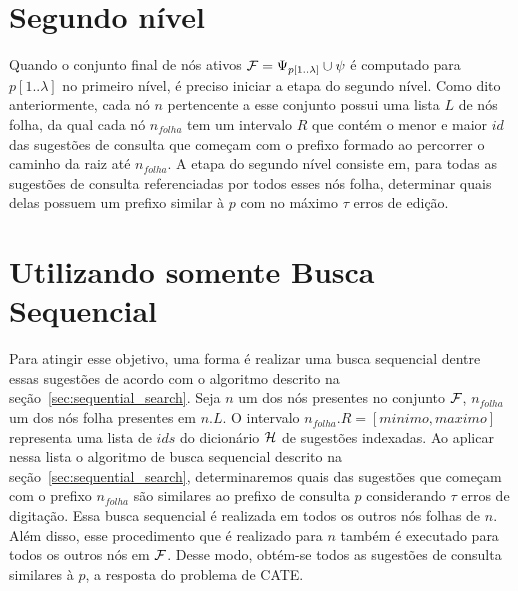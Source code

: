                 

\section{Segundo nível}
\label{sec:second_level}

Quando o conjunto final de nós ativos $\mathcal{F} = \Psi_{p[1..\lambda]} \cup \psi$ é computado para $p[1..\lambda]$ no primeiro nível, é preciso iniciar a etapa do segundo nível. Como dito anteriormente, cada nó $n$ pertencente a esse conjunto possui uma lista $L$ de nós folha, da qual cada nó $n_{folha}$ tem um intervalo $R$ que contém o menor e maior $id$ das sugestões de consulta que começam com o prefixo formado ao percorrer o caminho da raiz até $n_{folha}$. A etapa do segundo nível consiste em, para todas as sugestões de consulta referenciadas por todos esses nós folha, determinar quais delas possuem um prefixo similar à $p$ com no máximo $\tau$ erros de edição. 

\section{Utilizando somente Busca Sequencial} 
\label{sec:IP2L}

Para atingir esse objetivo, uma forma é realizar uma busca sequencial dentre essas sugestões de acordo com o algoritmo descrito na seção~\ref{sec:sequential_search}. Seja $n$ um dos nós presentes no conjunto $\mathcal{F}$, $n_{folha}$ um dos nós folha presentes em $n.L$. O intervalo $n_{folha}.R = [minimo, maximo]$ representa uma lista de $ids$ do dicionário $\mathcal{H}$ de sugestões indexadas. Ao aplicar nessa lista o algoritmo de busca sequencial descrito na seção~\ref{sec:sequential_search}, determinaremos quais das sugestões que começam com o prefixo $n_{folha}$ são similares ao prefixo de consulta $p$ considerando $\tau$ erros de digitação. Essa busca sequencial é realizada em todos os outros nós folhas de $n$. Além disso, esse procedimento que é realizado para $n$ também é executado para todos os outros nós em $\mathcal{F}$. Desse modo, obtém-se todos as sugestões de consulta similares à $p$, a resposta do problema de CATE.

